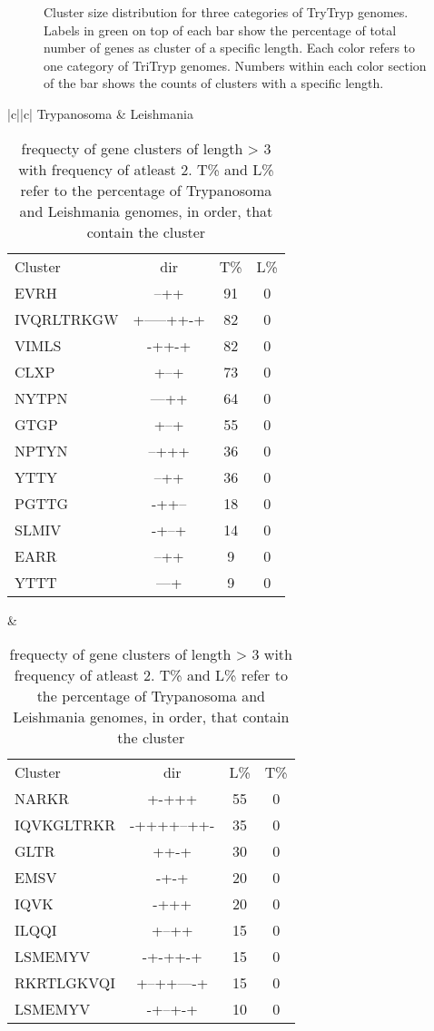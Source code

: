 \documentclass[table,
12pt, %
a4paper, %
oneside, %
headinclude,footinclude, %
BCOR5mm, %
]{scrartcl}
\begin{document}
\begin{figure}[H]
\centering 
{}
\caption[]{Cluster size distribution for three categories of TryTryp genomes. Labels in green on top of each bar show the percentage of total number of genes as cluster of a specific length. Each color refers to one category of TriTryp genomes. Numbers within each color section of the bar shows the counts of clusters with a specific length.}
\label{fig:Flogo} 
\end{figure}

\begin{table}[htbp]
\caption{frequecty of gene clusters of length > 3 with frequency of atleast 2. T\% and L\% refer to the percentage of Trypanosoma and Leishmania genomes, in order, that contain the cluster}
\begin{adjustbox}{center}
\begin{tabular}{|c||c|} \hline
Trypanosoma & Leishmania \\ \hline\hline
\begin{tabular}{l ccc}
Cluster&dir& T\%&L\%\\
EVRH&--++&91&0\\
IVQRLTRKGW&+-----++-+&82&0\\
VIMLS&-++-+&82&0\\
CLXP&+--+&73&0\\
NYTPN&---++&64&0\\
GTGP&+--+&55&0\\
NPTYN&--+++&36&0\\
YTTY&--++&36&0\\
PGTTG&-++--&18&0\\
SLMIV&-+--+&14&0\\
EARR&--++&9&0\\
YTTT&---+&9&0\\
\end{tabular} &

\begin{tabular}{l ccc}
Cluster&dir& L\%&T\%\\
NARKR&+-+++&55&0\\
IQVKGLTRKR&-++++--++-&35&0\\
GLTR&++-+&30&0\\
EMSV&-+-+&20&0\\
IQVK&-+++&20&0\\
ILQQI&+--++&15&0\\
LSMEMYV&-+-++-+&15&0\\
RKRTLGKVQI&+--++----+&15&0\\
LSMEMYV&-+--+-+&10&0\\
\end{tabular} \\ \hline
\end{tabular}
\end{adjustbox}
\end{table}
\end{document}
